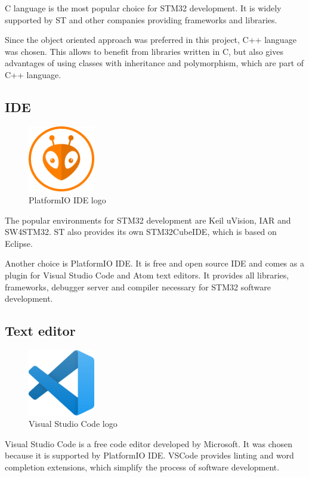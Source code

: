 \documentclass[a4paper,twoside,12pt]{book}
\begin{document}
C language is the most popular choice for STM32 development.
It is widely supported by ST and other companies providing frameworks and libraries. 

Since the object oriented approach was preferred in this project,
C++ language was chosen.
This allows to benefit from libraries written in C,
but also gives advantages of using classes with inheritance and polymorphism,
which are part of C++ language.

\subsection{IDE}

\begin{figure}[H]
    \centering
    \includegraphics[width=29mm]{images/platformio-logo}
    \caption{PlatformIO IDE logo}
    \label{fig:plaftormio}
\end{figure}

The popular environments for STM32 development are Keil uVision, IAR and SW4STM32.
ST also provides its own STM32CubeIDE, which is based on Eclipse.

Another choice is PlatformIO IDE.
It is free and open source IDE and
comes as a plugin for Visual Studio Code and Atom text editors.
It provides all libraries, frameworks,
debugger server and compiler necessary for STM32 software development.

\subsection{Text editor}
\begin{figure}[H]
    \centering
    \includegraphics[width=29mm]{images/vscode}
    \caption{Visual Studio Code logo}
    \label{fig:vscode}
\end{figure}

Visual Studio Code is a free code editor developed by Microsoft.
It was chosen because it is supported by PlatformIO IDE.
VSCode provides linting and word completion extensions,
which simplify the process of software development.
\end{document}
